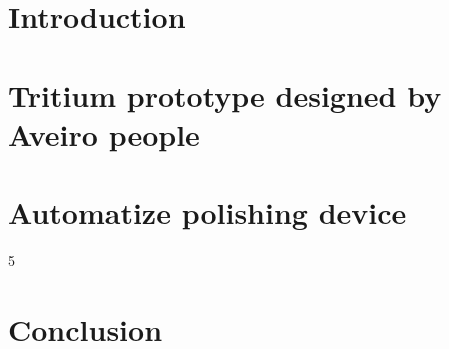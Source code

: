 \documentclass[11pt,a4paper]{article}
\begin{document}


\tableofcontents
\newpage


\section{Introduction} \label{sec:Introduction}


\section{Tritium prototype designed by Aveiro people} \label{sec:SetUp}


\section{Automatize polishing device} \label{sec:polishing}


5\section{Conclusion} \label{sec:conclusion}

\end{document}
